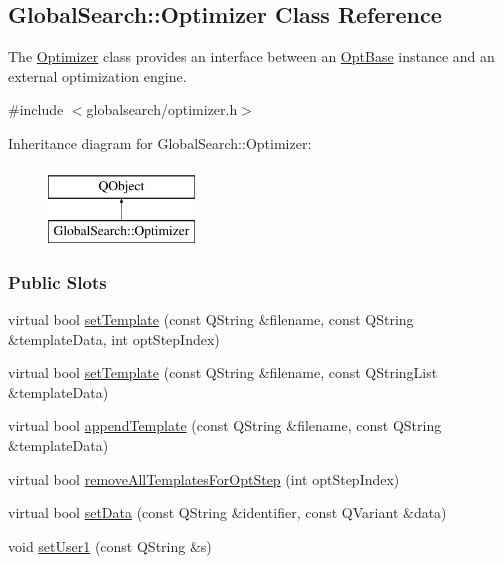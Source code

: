 \hypertarget{classGlobalSearch_1_1Optimizer}{}\subsection{Global\+Search\+:\+:Optimizer Class Reference}
\label{classGlobalSearch_1_1Optimizer}


The \hyperlink{classGlobalSearch_1_1Optimizer}{Optimizer} class provides an interface between an \hyperlink{classGlobalSearch_1_1OptBase}{Opt\+Base} instance and an external optimization engine.  




{\ttfamily \#include $<$globalsearch/optimizer.\+h$>$}

Inheritance diagram for Global\+Search\+:\+:Optimizer\+:\begin{figure}[H]
\begin{center}
\leavevmode
\includegraphics[height=2.000000cm]{classGlobalSearch_1_1Optimizer}
\end{center}
\end{figure}
\subsubsection*{Public Slots}
\begin{DoxyCompactItemize}
\item 
virtual bool \hyperlink{classGlobalSearch_1_1Optimizer_a83db0ac69c8b97825fc5d8361107ada4}{set\+Template} (const Q\+String \&filename, const Q\+String \&template\+Data, int opt\+Step\+Index)
\item 
virtual bool \hyperlink{classGlobalSearch_1_1Optimizer_ab4be28b4fc40d106ffa5ae1c9d67a6f3}{set\+Template} (const Q\+String \&filename, const Q\+String\+List \&template\+Data)
\item 
virtual bool \hyperlink{classGlobalSearch_1_1Optimizer_a8734827ff8773648cf4da48988208d87}{append\+Template} (const Q\+String \&filename, const Q\+String \&template\+Data)
\item 
virtual bool \hyperlink{classGlobalSearch_1_1Optimizer_a894c2cc508b92f2bb1678cc750faab30}{remove\+All\+Templates\+For\+Opt\+Step} (int opt\+Step\+Index)
\item 
virtual bool \hyperlink{classGlobalSearch_1_1Optimizer_a0bea17818fd8f29a13542119aebf2377}{set\+Data} (const Q\+String \&identifier, const Q\+Variant \&data)
\item 
void \hyperlink{classGlobalSearch_1_1Optimizer_adfb8a9de9d1eac7d5b188f6ae24c5ebc}{set\+User1} (const Q\+String \&s)
\end{DoxyCompactItemize}
